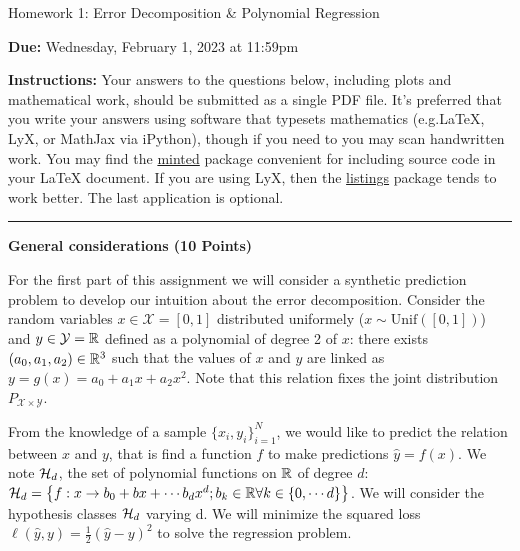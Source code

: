 \documentclass{article}
\newcommand{\bb}{b}
\newcommand{\ruleskip}{\bigskip\hrule\bigskip}
\begin{document}
\pagestyle{myheadings} 

\begin{center}
{\Large
Homework 1: Error Decomposition \& Polynomial Regression
} 
\end{center}

{
{ \color{nyupurple} \textbf{Due:} Wednesday, February 1, 2023 at 11:59pm} 
} 

\textbf{Instructions: }Your answers to the questions below, including plots and mathematical
 work, should be submitted as a single PDF file.  It's preferred that you write your answers using software that typesets mathematics (e.g.LaTeX, LyX, or MathJax via iPython), though if you need to you may scan handwritten work.  You may find the \href{https://github.com/gpoore/minted}{minted} package convenient for including source code in your LaTeX document.  If you are using LyX, then the \href{https://en.wikibooks.org/wiki/LaTeX/Source_Code_Listings}{listings} package tends to work better. The last application is optional. 

 \ruleskip

\textbf{\color{nyupurple} General considerations (10 Points)}

For the first part of this assignment we will consider a synthetic prediction problem to develop our intuition about the error decomposition. Consider the random variables $x \in \mathcal{X} = [0,1]$ distributed uniformely ($ x \sim \mathrm{Unif}([0,1])$) and $y \in \mathcal{Y} = {\mathbb{R}}$ defined as a polynomial of degree 2 of $x$: there exists $(a_0, a_1, a_2) \in {\mathbb{R}}^3$ such that the values of $x$ and $y$ are linked as $y = g(x) = a_0 + a_1 x + a_2 x^2$. Note that this relation fixes the joint distribution $P_{\mathcal{X} \times \mathcal{Y}}$.

From the knowledge of a sample $\{x_i, y_i\}_{i=1}^N$, we would like to predict the relation between $x$ and $y$, that is find a function $f$ to make predictions $\hat{y} = f(x)$. We note ${\mathcal{H}}_d$, the set of polynomial functions on $\mathbb{R}$ of degree $d$: $\gH_d = \left\{f: x \rightarrow \bb_0 + \bb x + \cdots \bb_d x^d; \bb_k \in \sR \forall k\in \{0, \cdots d\} \right\}$. We will consider the hypothesis classes ${\mathcal{H}}_d$ varying d.
We will minimize the squared loss $\ell(\hat{y},y) = \frac 1 2 (\hat{y} - y)^2$ to solve the regression problem.
\end{document}
